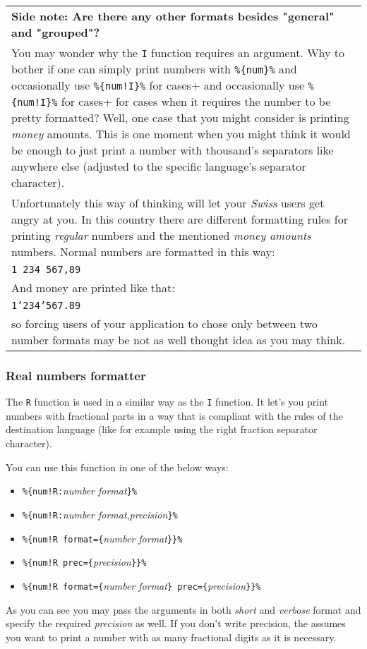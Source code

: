 \begin{tabular}{|p{}|}
\hline %
  \textbf{Side note: Are there any other formats besides "general" and "grouped"?} \\
  You may wonder why the \texttt{I} function requires an argument. 
  Why to bother if one can simply print numbers with \verb+%{num}%+ and occasionally use \verb+%{num!I}%+ for cases
  when it requires the number to be pretty formatted? 
  Well, one case that you might consider is printing \emph{money} amounts. 
  This is one moment when you might think it would be enough to just print a number with thousand's separators like anywhere else
  (adjusted to the specific language's separator character). \\
  Unfortunately this way of thinking will let your \emph{Swiss} users get angry at you. 
  In this country there are different formatting rules for printing \emph{regular} numbers and the mentioned \emph{money amounts} numbers. 
  Normal numbers are formatted in this way: \\ 
  \texttt{1~234~567,89}\\ 
  And money are printed like that: \\ 
  \texttt{1'234'567.89} \\
  so forcing users of your application to chose only between two number formats may be not as well thought idea as you may think.
  \\
\hline
\end{tabular}

\subsubsection{Real numbers formatter}
The \texttt{R} function is used in a similar way as the \texttt{I} function. 
It let's you print numbers with fractional parts in a way that is compliant with the rules of the destination language (like for example using the right fraction separator character).

You can use this function in one of the below ways:
\begin{itemize}
  \item \verb+%{num!R:+\textit{number format}\verb+}%+
  \item \verb+%{num!R:+\textit{number format},\textit{precision}\verb+}%+
  \item \verb+%{num!R format={+\textit{number format}\verb+}}%+
  \item \verb+%{num!R prec={+\textit{precision}\verb+}}%+
  \item \verb+%{num!R format={+\textit{number format}\verb+} prec={+\textit{precision}\verb+}}%+
\end{itemize}
As you can see you may pass the arguments in both \emph{short} and \emph{verbose} format and specify the required \emph{precision} as well.
If you don't write precision, the \mulan{} assumes you want to print a number with as many fractional digits as it is necessary.

